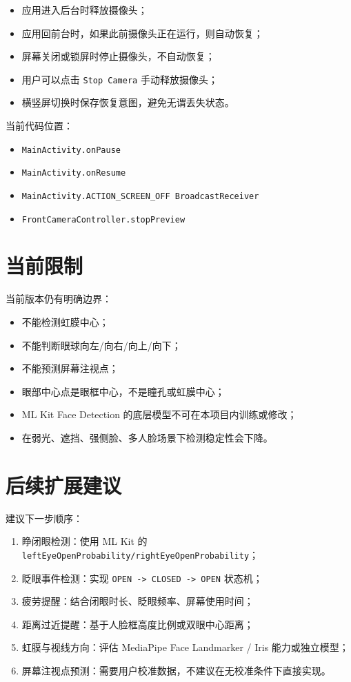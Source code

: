 \documentclass[UTF8,a4paper,11pt]{ctexart}
\begin{document}
\begin{itemize}
  \item 应用进入后台时释放摄像头；
  \item 应用回前台时，如果此前摄像头正在运行，则自动恢复；
  \item 屏幕关闭或锁屏时停止摄像头，不自动恢复；
  \item 用户可以点击 \texttt{Stop Camera} 手动释放摄像头；
  \item 横竖屏切换时保存恢复意图，避免无谓丢失状态。
\end{itemize}

当前代码位置：

\begin{itemize}
  \item \texttt{MainActivity.onPause}
  \item \texttt{MainActivity.onResume}
  \item \texttt{MainActivity.ACTION\_SCREEN\_OFF BroadcastReceiver}
  \item \texttt{FrontCameraController.stopPreview}
\end{itemize}

\section{当前限制}

当前版本仍有明确边界：

\begin{itemize}
  \item 不能检测虹膜中心；
  \item 不能判断眼球向左/向右/向上/向下；
  \item 不能预测屏幕注视点；
  \item 眼部中心点是眼框中心，不是瞳孔或虹膜中心；
  \item ML Kit Face Detection 的底层模型不可在本项目内训练或修改；
  \item 在弱光、遮挡、强侧脸、多人脸场景下检测稳定性会下降。
\end{itemize}

\section{后续扩展建议}

建议下一步顺序：

\begin{enumerate}
  \item 睁闭眼检测：使用 ML Kit 的 \texttt{leftEyeOpenProbability/rightEyeOpenProbability}；
  \item 眨眼事件检测：实现 \texttt{OPEN -> CLOSED -> OPEN} 状态机；
  \item 疲劳提醒：结合闭眼时长、眨眼频率、屏幕使用时间；
  \item 距离过近提醒：基于人脸框高度比例或双眼中心距离；
  \item 虹膜与视线方向：评估 MediaPipe Face Landmarker / Iris 能力或独立模型；
  \item 屏幕注视点预测：需要用户校准数据，不建议在无校准条件下直接实现。
\end{enumerate}
\end{document}

